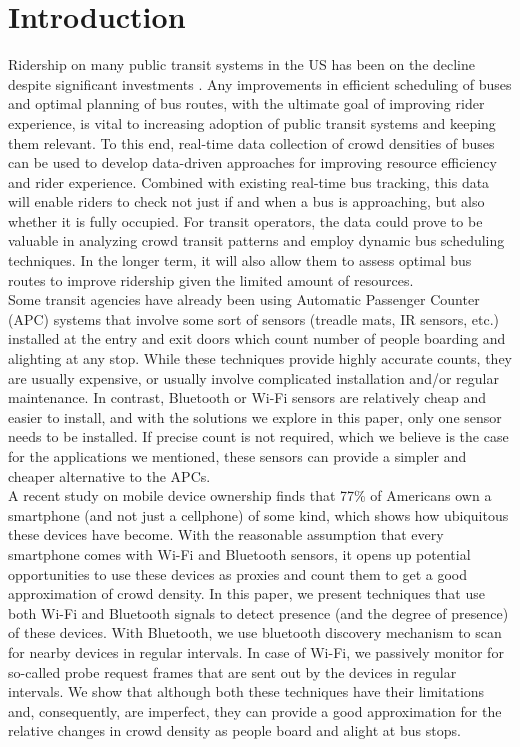 \section{Introduction}
\label{sec:intro}

Ridership on many public transit systems in the US has been on the decline despite significant investments \cite{William01}. Any improvements in efficient scheduling of buses and optimal planning of bus routes, with the ultimate goal of improving rider experience, is vital to increasing adoption of public transit systems and keeping them relevant. To this end, real-time data collection of crowd densities of buses can be used to develop data-driven approaches for improving resource efficiency and rider experience. Combined with existing real-time bus tracking, this data will enable riders to check not just if and when a bus is approaching, but also whether it is fully occupied. For transit operators, the data could prove to be valuable in analyzing crowd transit patterns and employ dynamic bus scheduling techniques. In the longer term, it will also allow them to assess optimal bus routes to improve ridership given the limited amount of resources. \\

Some transit agencies have already been using Automatic Passenger Counter (APC) systems that involve some sort of sensors (treadle mats, IR sensors, etc.) installed at the entry and exit doors which count number of people boarding and alighting at any stop. While these techniques provide highly accurate counts, they are usually expensive, or usually involve complicated installation and/or  regular maintenance. In contrast, Bluetooth or Wi-Fi sensors are relatively cheap and easier to install, and with the solutions we explore in this paper, only one sensor needs to be installed. If precise count is not required, which we believe is the case for the applications we mentioned, these sensors can provide a simpler and cheaper alternative to the APCs. \\

A recent study on mobile device ownership \cite{PewSurvey01} finds that 77\% of Americans own a smartphone (and not just a cellphone) of some kind, which shows how ubiquitous these devices have become. With the reasonable assumption that every smartphone comes with Wi-Fi and Bluetooth sensors, it opens up potential opportunities to use these devices as proxies and count them to get a good approximation of crowd density. In this paper, we present techniques that use both Wi-Fi and Bluetooth signals to detect presence (and the degree of presence) of these devices. With Bluetooth, we use bluetooth discovery mechanism to scan for nearby devices in regular intervals. In case of Wi-Fi, we passively monitor for so-called probe request frames that are sent out by the devices in regular intervals. We show that although both these techniques have their limitations and, consequently, are imperfect, they can provide a good approximation for the relative changes in crowd density as people board and alight at bus stops. \\

